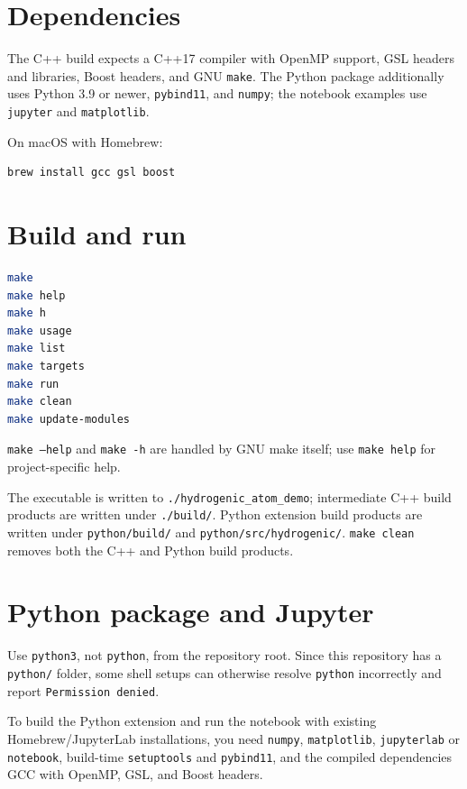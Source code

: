 \documentclass[11pt]{article}
\begin{document}
\section{Dependencies}

The C++ build expects a C++17 compiler with OpenMP support, GSL headers and libraries, Boost headers, and GNU \texttt{make}. The Python package additionally uses Python 3.9 or newer, \texttt{pybind11}, and \texttt{numpy}; the notebook examples use \texttt{jupyter} and \texttt{matplotlib}.

On macOS with Homebrew:

\begin{lstlisting}[language=bash]
brew install gcc gsl boost
\end{lstlisting}

\section{Build and run}

\begin{lstlisting}[language=bash]
make
make help
make h
make usage
make list
make targets
make run
make clean
make update-modules
\end{lstlisting}

\texttt{make --help} and \texttt{make -h} are handled by GNU make itself; use \texttt{make help} for project-specific help.

The executable is written to \texttt{./hydrogenic\_atom\_demo}; intermediate C++ build products are written under \texttt{./build/}. Python extension build products are written under \texttt{python/build/} and \texttt{python/src/hydrogenic/}. \texttt{make clean} removes both the C++ and Python build products.

\section{Python package and Jupyter}

Use \texttt{python3}, not \texttt{python}, from the repository root. Since this repository has a \texttt{python/} folder, some shell setups can otherwise resolve \texttt{python} incorrectly and report \texttt{Permission denied}.

To build the Python extension and run the notebook with existing Homebrew/JupyterLab installations, you need \texttt{numpy}, \texttt{matplotlib}, \texttt{jupyterlab} or \texttt{notebook}, build-time \texttt{setuptools} and \texttt{pybind11}, and the compiled dependencies GCC with OpenMP, GSL, and Boost headers.
\end{document}
